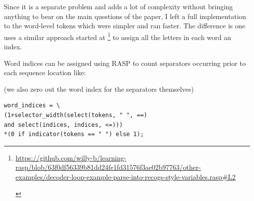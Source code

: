 \documentclass[11pt]{article}
\begin{document}
Since it is a separate problem and adds a lot of complexity without bringing anything to bear on the main questions of the paper, I left a full implementation to the word-level tokens which were simpler and ran faster. The difference is one uses a similar approach started at \footnote{\begin{footnotesize}\href{https://github.com/willy-b/learning-rasp/blob/63f0df56339b81dd24fe1fd31576f3ae02b97763/other-examples/decoder-loop-example-parse-into-recogs-style-variables.rasp\#L2}{https://github.com/willy-b/learning-rasp/blob/63f0df56339b81dd24fe1fd31576f3ae02b97763/other-examples/decoder-loop-example-parse-into-recogs-style-variables.rasp\#L2} \end{footnotesize}} to assign all the letters in each word an index. 

Word indices can be assigned using RASP to count separators occurring prior to each sequence location like:

(we also zero out the word index for the separators themselves)

\begin{tiny}
\begin{verbatim}
word_indices = \
(1+selector_width(select(tokens, " ", ==) 
and select(indices, indices, <=)))
*(0 if indicator(tokens == " ") else 1);
\end{verbatim}
\end{tiny}
\end{document}

